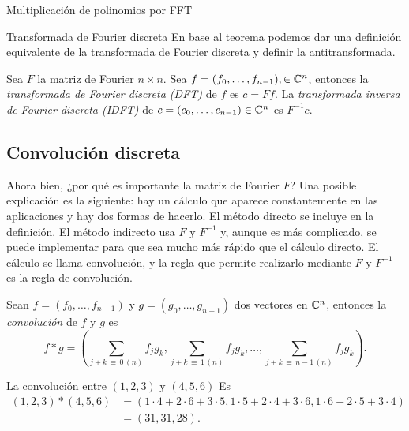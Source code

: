 \begin{chapter}{Multiplicación de polinomios por FFT}
\begin{section}{Transformada de Fourier discreta}
        En  base al teorema podemos dar una definición equivalente de la transformada de Fourier discreta y definir la antitransformada. 
        
        \begin{definicion}
            Sea $F$ la matriz de Fourier $n \times n$. Sea  $f = (f_0,\ldots,f_{n-1}), \in \mathbb C^n$, entonces la \textit{transformada de Fourier discreta (DFT)} de $f$ es $c = Ff$. La \textit{transformada inversa de Fourier discreta (IDFT)} de $c = (c_0,\ldots,c_{n-1}) \in \mathbb C^n$ es $F^{-1}c$.  
        \end{definicion}

        \subsection*{Convolución discreta} 

        Ahora bien, ¿por  qué es importante la matriz de Fourier $F$? Una posible explicación es la siguiente: hay un cálculo que aparece constantemente en las aplicaciones y hay dos formas de hacerlo. El método directo se incluye en la definición. El método indirecto usa $F$ y $F^{-1}$ y, aunque es más complicado, se puede implementar para que sea mucho más rápido que el cálculo directo. El cálculo se llama {convolución}, y la regla que permite realizarlo mediante  $F$ y $F^{-1}$ es la {regla de convolución.} 

        \begin{definicion}
            Sean $f = (f_0,\ldots, f_{n-1})$ y $g = (g_0,\ldots, g_{n-1})$ dos vectores en $\mathbb C^n$,  entonces la  \textit{convolución} de $f$ y $g$ es 
            \begin{equation*}
                f * g = \left(\sum_{j+k \,\equiv\, 0\, (n)} f_jg_k, \sum_{j+k \,\equiv\, 1\, (n)} f_jg_k, \ldots, \sum_{j+k\, \equiv\, n-1 \,(n)} f_jg_k\right).
            \end{equation*}
        \end{definicion}

        \begin{ejemplo}
            La convolución entre $(1,2,3)$ y $(4,5,6)$ Es
            \begin{align*}
                (1,2,3)*(4,5,6) &= (1 \cdot 4 + 2\cdot 6 + 3\cdot 5, 1\cdot 5+  2\cdot 4 + 3\cdot 6, 1\cdot 6 + 2\cdot 5 + 3\cdot 4)\\ &= (31, 31, 28).
            \end{align*}
        \end{ejemplo}


\end{section}
\end{chapter}
